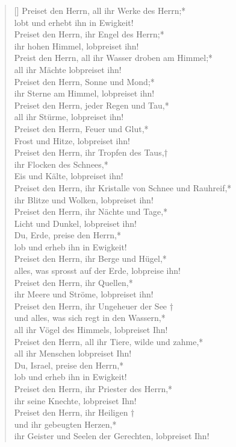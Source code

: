 \begin{verse}[\versewidth]
 Preiset den Herrn, all ihr Werke des Herrn;*\\
 lobt und erhebt ihn in Ewigkeit!\\
\vin Preiset den Herrn, ihr Engel des Herrn;*\\
\vin ihr hohen Himmel, lobpreiset ihn!\\
Preist den Herrn, all ihr Wasser droben am Himmel;*\\
all ihr Mächte lobpreiset ihn!\\
\vin Preiset den Herrn, Sonne und Mond;*\\
\vin ihr Sterne am Himmel, lobpreiset ihn!\\
Preiset den Herrn, jeder Regen und Tau,*\\
all ihr Stürme, lobpreiset ihn!\\
\vin Preiset den Herrn, Feuer und Glut,*\\
\vin Frost und Hitze, lobpreiset ihn!\\
Preiset den Herrn, ihr Tropfen des Taus,†\\
ihr Flocken des Schnees,*\\
Eis und Kälte, lobpreiset ihn!\\
\vin Preiset den Herrn, ihr Kristalle von Schnee und Rauhreif,*\\
\vin ihr Blitze und Wolken, lobpreiset ihn!\\
Preiset den Herrn, ihr Nächte und Tage,*\\
Licht und Dunkel, lobpreiset ihn!\\
\vin Du, Erde,  preise den Herrn,*\\
\vin lob und erheb ihn in Ewigkeit!\\
Preiset den Herrn, ihr Berge und Hügel,*\\
alles, was sprosst auf der Erde, lobpreise ihn!\\
\vin Preiset den Herrn, ihr Quellen,*\\
\vin ihr Meere und Ströme, lobpreiset ihn!\\
Preiset den Herrn, ihr Ungeheuer der See †\\
und alles, was sich regt in den Wassern,*\\
all ihr Vögel des Himmels, lobpreiset Ihn!\\
\vin Preiset den Herrn, all ihr Tiere, wilde und zahme,*\\
\vin all ihr Menschen lobpreiset Ihn!\\
Du, Israel, preise den Herrn,*\\
lob und erheb ihn in Ewigkeit!\\
\vin Preiset den Herrn, ihr Priester des Herrn,*\\
\vin ihr seine Knechte, lobpreiset Ihn!\\
Preiset den Herrn, ihr Heiligen †\\
und ihr gebeugten Herzen,*\\
ihr Geister und Seelen der Gerechten, lobpreiset Ihn!\\


\end{verse}
